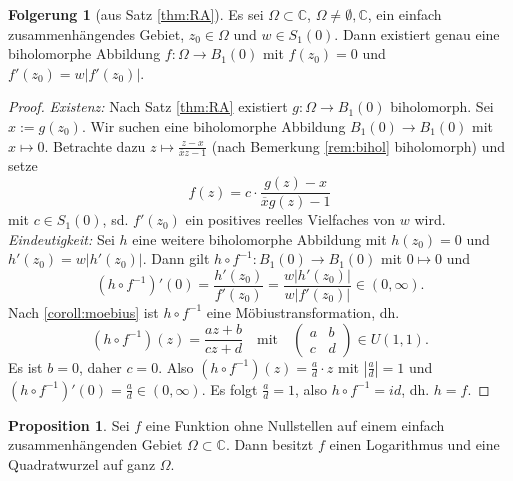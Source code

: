 \documentclass[11pt,titlepage]{article}
\theoremstyle{definition}
\newtheorem{corollary}[theorem]{Folgerung}
\newtheorem{proposition}[theorem]{Proposition}
\theoremstyle{remark}
\begin{document}
	\begin{corollary}[aus Satz \ref{thm:RA}]
		Es sei $\Omega\subset\mathbb{C}$, $\Omega\neq\emptyset,\mathbb{C}$, 
		ein einfach zusammenhängendes Gebiet, $z_0\in\Omega$ und 
		$w\in S_1(0)$. Dann existiert genau eine biholomorphe Abbildung $f:\Omega\to B_1(0)$ mit 
		$f(z_0)=0$ und $f'(z_0)=w|f'(z_0)|$.
	\end{corollary}
	
	\begin{proof}
		\textsl{Existenz:} Nach Satz \ref{thm:RA} existiert $g:\Omega\to B_1(0)$ biholomorph. Sei $x:=g(z_0)$. 
		Wir suchen eine biholomorphe Abbildung $B_1(0)\to B_1(0)$ mit $x\mapsto 0$. Betrachte dazu 
		$z\mapsto \frac{z-x}{\overline{x}z-1}$ (nach Bemerkung \ref{rem:bihol} biholomorph) und setze 
		\[ f(z)=c\cdot \frac{g(z)-x}{\overline{x}g(z)-1} \]
		mit $c\in S_1(0)$, sd. $f'(z_0)$ ein positives reelles Vielfaches von $w$ wird. \\
		
		\textsl{Eindeutigkeit:} Sei $h$ eine weitere biholomorphe Abbildung mit $h(z_0)=0$ und 
		$h'(z_0)=w|h'(z_0)|$. Dann gilt $h\circ f^{-1}:B_1(0)\to B_1(0)$ mit $0\mapsto 0$ und 
		\[ \left(h\circ f^{-1}\right)'(0)=\frac{h'(z_0)}{f'(z_0)}=\frac{ w|h'(z_0)|}{w|f'(z_0)|} \in(0,\infty). \]
		Nach \ref{coroll:moebius} ist $h\circ f^{-1}$ eine Möbiustransformation, dh.
		\[ \left(h\circ f^{-1}\right)(z)=\frac{az+b}{cz+d} \quad\text{mit}\quad 
		\begin{pmatrix} a&b\\c&d \end{pmatrix}\in U(1,1). \]
		Es ist $b=0$, daher $c=0$. Also $(h\circ f^{-1})(z)=\frac{a}{d}\cdot z$ mit $|\frac{a}{d}|=1$ und 
		$(h\circ f^{-1})'(0)=\frac{a}{d}\in (0,\infty)$. Es folgt $\frac{a}{d}=1$, also $h\circ f^{-1}=id$, dh. 
		$h=f$.
	\end{proof}
	
	\begin{proposition} \label{rem:log}
		Sei $f$ eine Funktion ohne Nullstellen auf einem einfach zusammenhängenden Gebiet 
		$\Omega\subset\mathbb{C}$. Dann besitzt $f$ einen Logarithmus und eine Quadratwurzel auf 
		ganz $\Omega$.
	\end{proposition}
	
\end{document}
